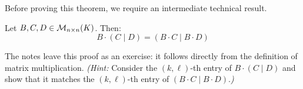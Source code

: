 Before proving this theorem, we require an intermediate technical result.

\begin{lemma}
\label{lemma:block_matrix_multiplication}
Let $B, C, D \in \mathcal{M}_{n \times n}(K)$. Then:
\begin{equation*}
    B \cdot \left(C \mid D\right) = \left(B \cdot C \mid B \cdot D\right)
\end{equation*}
\end{lemma}

\begin{exercise}
\label{exc:block_matrix_multiplication}
The notes leave this proof as an exercise: it follows directly from the definition of matrix multiplication. \textit{(Hint:} Consider the $(k,\ell)$-th entry of $B \cdot (C \mid D)$ and show that it matches the $(k,\ell)$-th entry of $(B \cdot C \mid B \cdot D)$.\textit{)}
\end{exercise}

